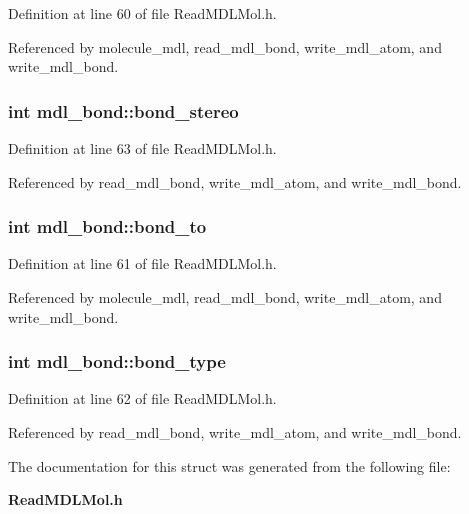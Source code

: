 Definition at line 60 of file Read\-MDLMol.h.

Referenced by molecule\_\-mdl, read\_\-mdl\_\-bond, write\_\-mdl\_\-atom, and write\_\-mdl\_\-bond.
\subsubsection{\setlength{\rightskip}{0pt plus 5cm}int mdl\_\-bond::bond\_\-stereo}\label{structmdl__bond_m3}




Definition at line 63 of file Read\-MDLMol.h.

Referenced by read\_\-mdl\_\-bond, write\_\-mdl\_\-atom, and write\_\-mdl\_\-bond.
\subsubsection{\setlength{\rightskip}{0pt plus 5cm}int mdl\_\-bond::bond\_\-to}\label{structmdl__bond_m1}




Definition at line 61 of file Read\-MDLMol.h.

Referenced by molecule\_\-mdl, read\_\-mdl\_\-bond, write\_\-mdl\_\-atom, and write\_\-mdl\_\-bond.
\subsubsection{\setlength{\rightskip}{0pt plus 5cm}int mdl\_\-bond::bond\_\-type}\label{structmdl__bond_m2}




Definition at line 62 of file Read\-MDLMol.h.

Referenced by read\_\-mdl\_\-bond, write\_\-mdl\_\-atom, and write\_\-mdl\_\-bond.

The documentation for this struct was generated from the following file:\begin{CompactItemize}
\item 
{\bf Read\-MDLMol.h}\end{CompactItemize}
